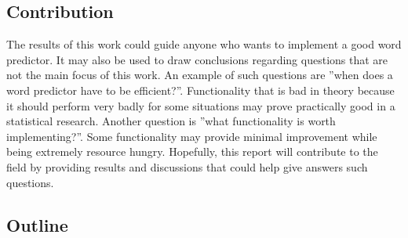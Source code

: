 \subsection{Contribution}
The results of this work could guide anyone who wants to implement a good word predictor. It may also be used to draw conclusions regarding questions that are not the main focus of this work. An example of such questions are ''when does a word predictor have to be efficient?''. Functionality that is bad in theory because it should perform very badly for some situations may prove practically good in a statistical research. Another question is ''what functionality is worth implementing?''. Some functionality may provide minimal improvement while being extremely resource hungry. Hopefully, this report will contribute to the field by providing results and discussions that could help give answers such questions.

\subsection{Outline}
\lipsum[1]